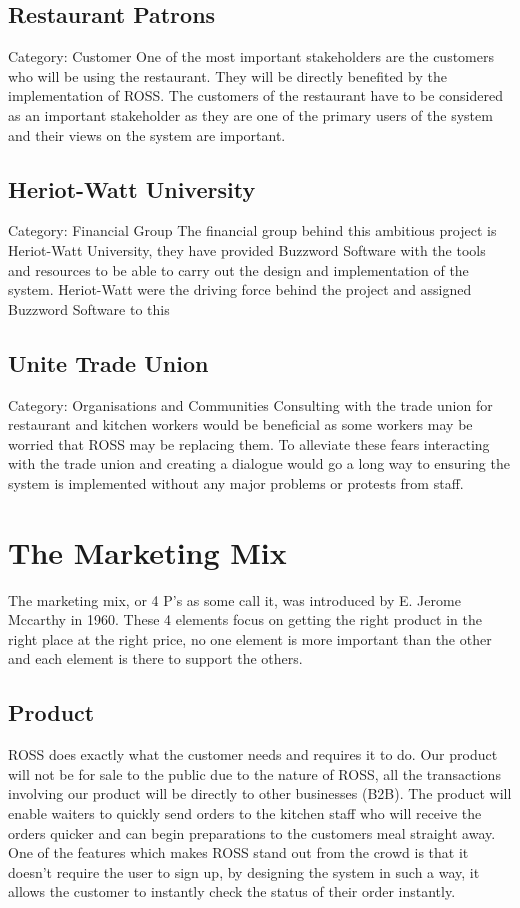 \documentclass[11pt, oneside, a4paper]{report}   %
\begin{document}
\begin{flushleft}
\subsection{Restaurant Patrons}
Category: Customer
\linebreak
One of the most important stakeholders are the customers who will be using the restaurant. They will be directly benefited by the implementation of ROSS. The customers of the restaurant have to be considered as an important stakeholder as they are one of the primary users of the system and their views on the system are important. 

\subsection{Heriot-Watt University}
Category: Financial Group 
\linebreak
The financial group behind this ambitious project is Heriot-Watt University, they have provided Buzzword Software with the tools and resources to be able to carry out the design and implementation of the system. Heriot-Watt were the driving force behind the project and assigned Buzzword Software to this

\subsection{Unite Trade Union}
Category: Organisations and Communities
\linebreak
Consulting with the trade union for restaurant and kitchen workers would be beneficial as some workers may be worried that ROSS may be replacing them. To alleviate these fears interacting with the trade union and creating a dialogue would go a long way to ensuring the system is implemented without any major problems or protests from staff.


\newpage
\section{The Marketing Mix}
The marketing mix, or 4 P’s as some call it, was introduced by E. Jerome Mccarthy in 1960. These 4 elements focus on getting the right product in the right place at the right price, no one element is more important than the other and each element is there to support the others. 
\subsection{Product}
ROSS does exactly what the customer needs and requires it to do. Our product will not be for sale to the public due to the nature of ROSS, all the transactions involving our product will be directly to other businesses (B2B). The product will enable waiters to quickly send orders to the kitchen staff who will receive the orders quicker and can begin preparations to the customers meal straight away. One of the features which makes ROSS stand out from the crowd is that it doesn’t require the user to sign up, by designing the system in such a way, it allows the customer to instantly check the status of their order instantly. 

\end{flushleft}
\end{document}
